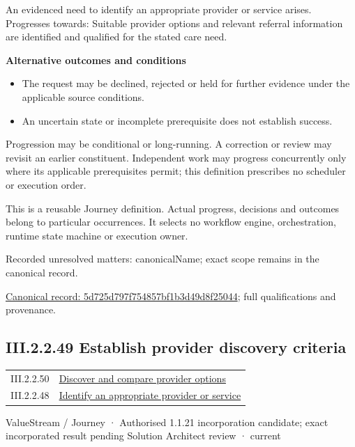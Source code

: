 An evidenced need to identify an appropriate provider or service arises. Progresses towards: Suitable provider options and relevant referral information are identified and qualified for the stated care need.



\par\medskip\textbf{Alternative outcomes and conditions}\par


\begin{itemize}


\item The request may be declined, rejected or held for further evidence under the applicable source conditions.

\item An uncertain state or incomplete prerequisite does not establish success.

\end{itemize}


Progression may be conditional or long-running. A correction or review may revisit an earlier constituent. Independent work may progress concurrently only where its applicable prerequisites permit; this definition prescribes no scheduler or execution order.



This is a reusable Journey definition. Actual progress, decisions and outcomes belong to particular occurrences. It selects no workflow engine, orchestration, runtime state machine or execution owner.


{\small Recorded unresolved matters: canonicalName; exact scope remains in the canonical record.}\par
{\footnotesize \href{../../../../continuum/strategy/value-stream/5d725d797f754857bf1b3d49d8f25044.md}{Canonical record: 5d725d797f754857bf1b3d49d8f25044}; full qualifications and provenance.}\par
\subsection*{III.2.2.49 Establish provider discovery criteria}
\label{navigation:III.2.2.49}

\begin{longtable}{p{.22\linewidth}p{.73\linewidth}}
III.2.2.50 & \hyperref[element:13370b1e9a1349d8ba074e3ad5a8c1ae]{Discover and compare provider options} \\
III.2.2.48 & \hyperref[element:5d725d797f754857bf1b3d49d8f25044]{Identify an appropriate provider or service} \\
\end{longtable}
\label{element:4b20709f112540978fc6dafd6c85beed}
{\small ValueStream / Journey · Authorised 1.1.21 incorporation candidate; exact incorporated result pending Solution Architect review · current}\par

